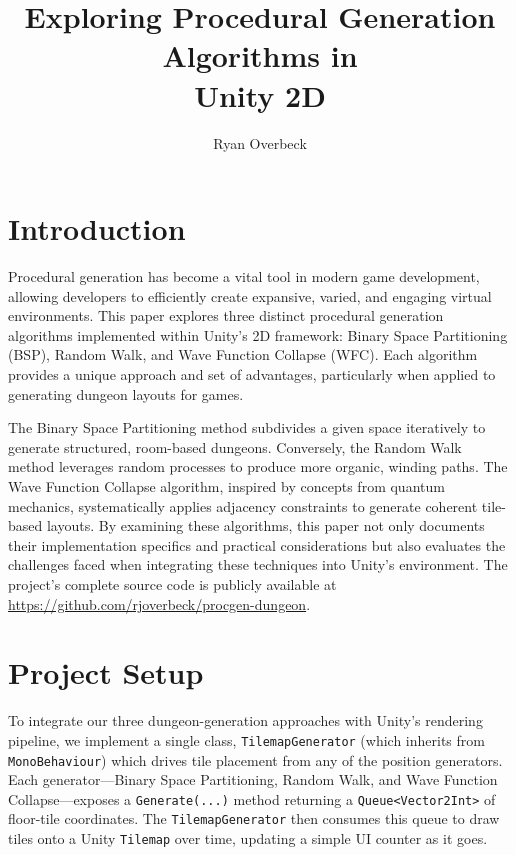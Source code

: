 \documentclass[a4paper, 12pt, one column, aas_macros]{article}
\title{Exploring Procedural Generation Algorithms in \\Unity 2D}
\author{Ryan Overbeck}
\begin{document}
\maketitle


\tableofcontents


\section{Introduction}
Procedural generation has become a vital tool in modern game development, allowing developers to efficiently create expansive, varied, and engaging virtual environments. This paper explores three distinct procedural generation algorithms implemented within Unity's 2D framework: Binary Space Partitioning (BSP), Random Walk, and Wave Function Collapse (WFC). Each algorithm provides a unique approach and set of advantages, particularly when applied to generating dungeon layouts for games.

The Binary Space Partitioning method subdivides a given space iteratively to generate structured, room-based dungeons. Conversely, the Random Walk method leverages random processes to produce more organic, winding paths. The Wave Function Collapse algorithm, inspired by concepts from quantum mechanics, systematically applies adjacency constraints to generate coherent tile-based layouts. By examining these algorithms, this paper not only documents their implementation specifics and practical considerations but also evaluates the challenges faced when integrating these techniques into Unity's environment. The project's complete source code is publicly available at \url{https://github.com/rjoverbeck/procgen-dungeon}.

\section{Project Setup}
To integrate our three dungeon-generation approaches with Unity's rendering pipeline, we implement a single class, \texttt{TilemapGenerator} (which inherits from \texttt{MonoBehaviour}) which drives tile placement from any of the position generators. Each generator---Binary Space Partitioning, Random Walk, and Wave Function Collapse---exposes a \texttt{Generate(...)} method returning a \texttt{Queue<Vector2Int>} of floor-tile coordinates. The \texttt{TilemapGenerator} then consumes this queue to draw tiles onto a Unity \texttt{Tilemap} over time, updating a simple UI counter as it goes.
\end{document}
